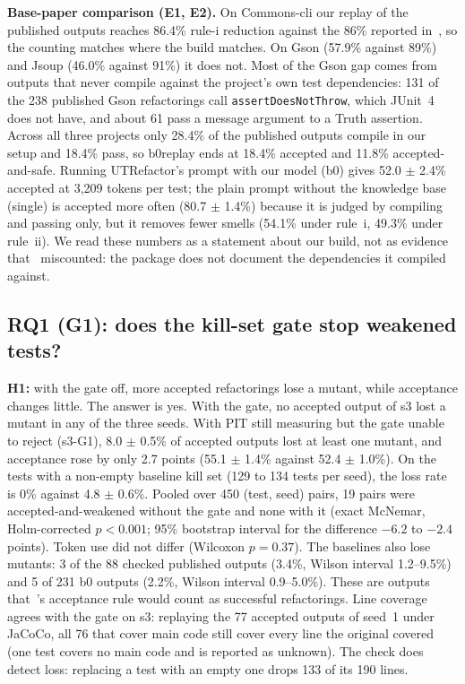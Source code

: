 \textbf{Base-paper comparison (E1, E2).} On Commons-cli our replay of the published outputs reaches 86.4\% rule-i reduction against the 86\% reported in~\cite{utrefactor}, so the counting matches where the build matches.
On Gson (57.9\% against 89\%) and Jsoup (46.0\% against 91\%) it does not. Most of the Gson gap comes from outputs that never compile against the project's own test dependencies: 131 of the 238 published Gson refactorings call \texttt{assertDoesNotThrow}, which JUnit~4 does not have, and about 61 pass a message argument to a Truth assertion.
Across all three projects only 28.4\% of the published outputs compile in our setup and 18.4\% pass, so \textsf{b0replay} ends at 18.4\% accepted and 11.8\% accepted-and-safe.
Running UTRefactor's prompt with our model (\textsf{b0}) gives 52.0 $\pm$ 2.4\% accepted at 3{,}209 tokens per test; the plain prompt without the knowledge base (\textsf{single}) is accepted more often (80.7 $\pm$ 1.4\%) because it is judged by compiling and passing only, but it removes fewer smells (54.1\% under rule~i, 49.3\% under rule~ii).
We read these numbers as a statement about our build, not as evidence that~\cite{utrefactor} miscounted: the package does not document the dependencies it compiled against.

\subsection{RQ1 (G1): does the kill-set gate stop weakened tests?}
\textbf{H1:} with the gate off, more accepted refactorings lose a mutant, while acceptance changes little.
The answer is yes. With the gate, no accepted output of \textsf{s3} lost a mutant in any of the three seeds. With PIT still measuring but the gate unable to reject (\textsf{s3-G1}), 8.0 $\pm$ 0.5\% of accepted outputs lost at least one mutant, and acceptance rose by only 2.7 points (55.1 $\pm$ 1.4\% against 52.4 $\pm$ 1.0\%).
On the tests with a non-empty baseline kill set (129 to 134 tests per seed), the loss rate is 0\% against 4.8 $\pm$ 0.6\%.
Pooled over 450 (test, seed) pairs, 19 pairs were accepted-and-weakened without the gate and none with it (exact McNemar, Holm-corrected $p<0.001$; 95\% bootstrap interval for the difference $-6.2$ to $-2.4$ points). Token use did not differ (Wilcoxon $p=0.37$).
The baselines also lose mutants: 3 of the 88 checked published outputs (3.4\%, Wilson interval 1.2--9.5\%) and 5 of 231 \textsf{b0} outputs (2.2\%, Wilson interval 0.9--5.0\%). These are outputs that~\cite{utrefactor}'s acceptance rule would count as successful refactorings.
Line coverage agrees with the gate on \textsf{s3}: replaying the 77 accepted outputs of seed~1 under JaCoCo, all 76 that cover main code still cover every line the original covered (one test covers no main code and is reported as unknown). The check does detect loss: replacing a test with an empty one drops 133 of its 190 lines.

